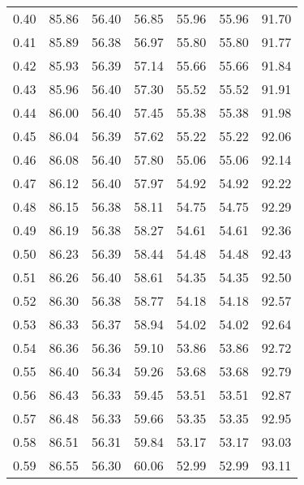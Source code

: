 \begin{tabular}{|c|c|c|c|c|c|c|}
      0.40 &     85.86 &     56.40 &      56.85 &   55.96 &      55.96 &         91.70 \\
      0.41 &     85.89 &     56.38 &      56.97 &   55.80 &      55.80 &         91.77 \\
      0.42 &     85.93 &     56.39 &      57.14 &   55.66 &      55.66 &         91.84 \\
      0.43 &     85.96 &     56.40 &      57.30 &   55.52 &      55.52 &         91.91 \\
      0.44 &     86.00 &     56.40 &      57.45 &   55.38 &      55.38 &         91.98 \\
      0.45 &     86.04 &     56.39 &      57.62 &   55.22 &      55.22 &         92.06 \\
      0.46 &     86.08 &     56.40 &      57.80 &   55.06 &      55.06 &         92.14 \\
      0.47 &     86.12 &     56.40 &      57.97 &   54.92 &      54.92 &         92.22 \\
      0.48 &     86.15 &     56.38 &      58.11 &   54.75 &      54.75 &         92.29 \\
      0.49 &     86.19 &     56.38 &      58.27 &   54.61 &      54.61 &         92.36 \\
      0.50 &     86.23 &     56.39 &      58.44 &   54.48 &      54.48 &         92.43 \\
      0.51 &     86.26 &     56.40 &      58.61 &   54.35 &      54.35 &         92.50 \\
      0.52 &     86.30 &     56.38 &      58.77 &   54.18 &      54.18 &         92.57 \\
      0.53 &     86.33 &     56.37 &      58.94 &   54.02 &      54.02 &         92.64 \\
      0.54 &     86.36 &     56.36 &      59.10 &   53.86 &      53.86 &         92.72 \\
      0.55 &     86.40 &     56.34 &      59.26 &   53.68 &      53.68 &         92.79 \\
      0.56 &     86.43 &     56.33 &      59.45 &   53.51 &      53.51 &         92.87 \\
      0.57 &     86.48 &     56.33 &      59.66 &   53.35 &      53.35 &         92.95 \\
      0.58 &     86.51 &     56.31 &      59.84 &   53.17 &      53.17 &         93.03 \\
      0.59 &     86.55 &     56.30 &      60.06 &   52.99 &      52.99 &         93.11 \\

\end{tabular}
